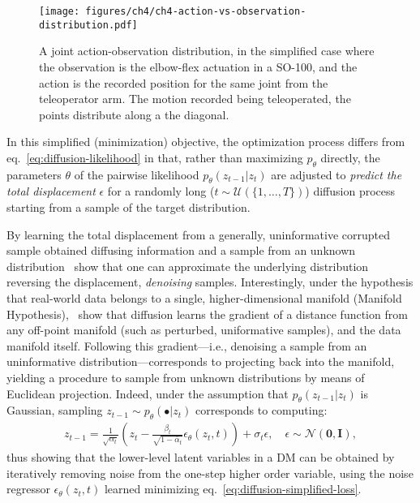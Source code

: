 \begin{figure}
    \centering
    \texttt{[image: figures/ch4/ch4-action-vs-observation-distribution.pdf]}
    \caption{A joint action-observation distribution, in the simplified case where the observation is the elbow-flex actuation in a SO-100, and the action is the recorded position for the same joint from the teleoperator arm. The motion recorded being teleoperated, the points distribute along a the diagonal.}
    \label{fig:ch4-action-vs-observation-distribution}
\end{figure}

In this simplified (minimization) objective, the optimization process differs from eq.~\ref{eq:diffusion-likelihood} in that, rather than maximizing \( p_\theta \) directly, the parameters \( \theta \) of the pairwise likelihood \( p_\theta(z_{t-1} \vert z_t) \) are adjusted to \emph{predict the total displacement} \( \epsilon \) for a randomly long (\( t \sim \mathcal{U}(\{1,\dots,T\}) \)) diffusion process starting from a sample of the target distribution.

By learning the total displacement from a generally, uninformative corrupted sample obtained diffusing information and a sample from an unknown distribution~\citet{hoDenoisingDiffusionProbabilistic2020} show that one can approximate the underlying distribution reversing the displacement, \emph{denoising} samples.
Interestingly, under the hypothesis that real-world data belongs to a single, higher-dimensional manifold (Manifold Hypothesis),~\citet{permenterInterpretingImprovingDiffusion2024} show that diffusion learns the gradient of a distance function from any off-point manifold (such as perturbed, uniformative samples), and the data manifold itself.
Following this gradient---i.e., denoising a sample from an uninformative distribution---corresponds to projecting back into the manifold, yielding a procedure to sample from unknown distributions by means of Euclidean projection.
Indeed, under the assumption that \(p_\theta (z_{t-1} \vert z_t) \) is Gaussian, sampling \(z_{t-1} \sim p_\theta(\bullet \vert z_{t}) \) corresponds to computing:
\begin{align}
    z_{t-1} = \frac{1}{\sqrt{\alpha_t}} \left( z_t - \frac{\beta_t}{\sqrt{1 - \bar\alpha_t}} \epsilon_\theta(z_t, t) \right) + \sigma_t \epsilon, \quad \epsilon \sim \mathcal N(\mathbf{0}, \mathbf{I}), \label{eq:diffusion-denoising-definition}
\end{align}
thus showing that the lower-level latent variables in a DM can be obtained by iteratively removing noise from the one-step higher order variable, using the noise regressor \( \epsilon_\theta(z_t, t)\) learned minimizing eq.~\ref{eq:diffusion-simplified-loss}.

